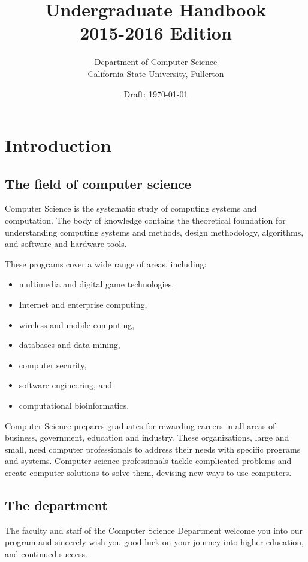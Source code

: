 \documentclass{book}
\begin{document}
\title{Undergraduate Handbook \\ 2015-2016 Edition}
\author{Department of Computer Science \\ California State University, Fullerton}
\date{Draft: \today}
\maketitle

\newpage
\tableofcontents

\chapter{Introduction}

\section{The field of computer science}
Computer Science is the systematic study of computing systems and computation. The body of knowledge contains the theoretical foundation for understanding computing systems and methods, design methodology, algorithms, and software and hardware tools.

These programs cover a wide range of areas, including:
\begin{itemize}
\item multimedia and digital game technologies,
\item Internet and enterprise computing,
\item wireless and mobile computing,
\item databases and data mining,
\item computer security,
\item software engineering, and
\item computational bioinformatics.
\end{itemize}

Computer Science prepares graduates for rewarding careers in all areas of business, government, education and industry. These organizations, large and small, need computer professionals to address their needs with specific programs and systems. Computer science professionals tackle complicated problems and create computer solutions to solve them, devising new ways to use computers.

\section{The department}
\label{section:the_department}
The faculty and staff of the Computer Science Department welcome you into our program and sincerely wish you good luck on your journey into higher education, and continued success.
\end{document}
